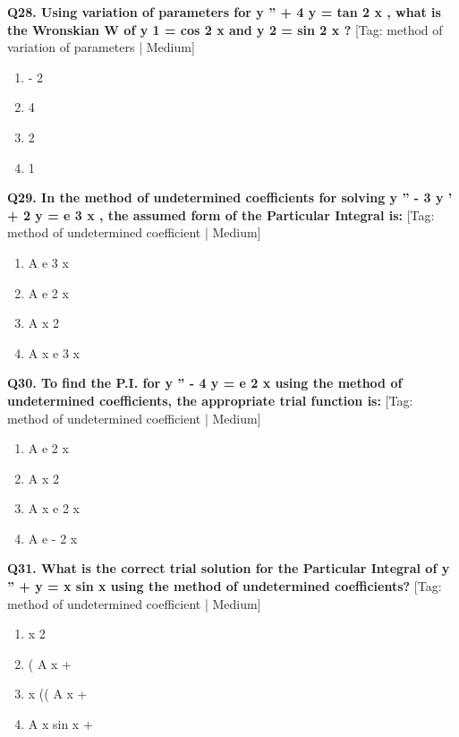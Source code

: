 \noindent\textbf{Q28. Using variation of parameters for y '' + 4 y = tan 2 x , what is the Wronskian W of y 1 = cos 2 x and y 2 = sin 2 x ?} \hfill [Tag: method of variation of parameters | Medium]
\begin{enumerate}[label=(\alph*),topsep=2pt,itemsep=1pt,partopsep=0pt,parsep=0pt]
    \item {{- 2}}
    \item {{4}}
    \item {{2}}
    \item {{1}}
\end{enumerate}
\vspace{2mm}

\noindent\textbf{Q29. In the method of undetermined coefficients for solving y '' - 3 y ' + 2 y = e 3 x , the assumed form of the Particular Integral is:} \hfill [Tag: method of undetermined coefficient | Medium]
\begin{enumerate}[label=(\alph*),topsep=2pt,itemsep=1pt,partopsep=0pt,parsep=0pt]
    \item {{A e 3 x}}
    \item {{A e 2 x}}
    \item {{A x 2}}
    \item {{A x e 3 x}}
\end{enumerate}
\vspace{2mm}

\noindent\textbf{Q30. To find the P.I. for y '' - 4 y = e 2 x using the method of undetermined coefficients, the appropriate trial function is:} \hfill [Tag: method of undetermined coefficient | Medium]
\begin{enumerate}[label=(\alph*),topsep=2pt,itemsep=1pt,partopsep=0pt,parsep=0pt]
    \item {{A e 2 x}}
    \item {{A x 2}}
    \item {{A x e 2 x}}
    \item {{A e - 2 x}}
\end{enumerate}
\vspace{2mm}

\noindent\textbf{Q31. What is the correct trial solution for the Particular Integral of y '' + y = x sin x using the method of undetermined coefficients?} \hfill [Tag: method of undetermined coefficient | Medium]
\begin{enumerate}[label=(\alph*),topsep=2pt,itemsep=1pt,partopsep=0pt,parsep=0pt]
    \item {{x 2}}
    \item {{( A x +}}
    \item {{x (( A x +}}
    \item {{A x sin x +}}
\end{enumerate}
\vspace{2mm}

